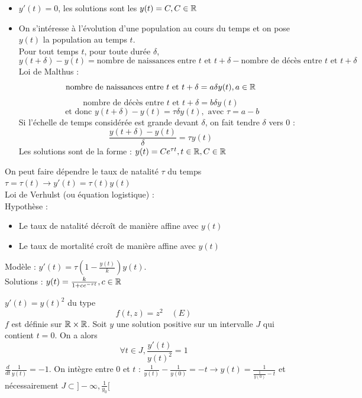 \documentclass[]{report}
\begin{document}
\begin{ex}{}{}
    \begin{itemize}
        \item $y'(t)=0$, les solutions sont les $y(t)=C,C\in\mathbb{R}$
        \item
        On s'intéresse à l'évolution d'une population au cours du temps et on pose $y(t)$ la population au temps $t$.\\
        Pour tout temps $t$, pour toute durée $\delta$, $$y(t+\delta)-y(t)=\text{nombre de naissances entre $t$ et $t+\delta$}-\text{nombre de décès entre $t$ et $t+\delta$}$$
        Loi de Malthus : $$\text{nombre de naissances entre $t$ et $t+\delta$}=a \delta y(t),a\in\mathbb{R}$$
        $$\text{nombre de décès entre $t$ et $t+\delta$}=b\delta y(t)$$
        $$\text{ et donc } y(t+\delta)-y(t)=\tau\delta y(t),\text{ avec }\tau=a-b$$
        Si l'échelle de temps considérée est grande devant $\delta$, on fait tendre $\delta$ vers $0$ :
        $$\frac{y(t+\delta)-y(t)}{\delta}=\tau y(t)$$
        Les solutions sont de la forme : $y(t)=Ce^{\tau t},t\in\mathbb{R},C\in\mathbb{R}$
    \end{itemize}
\end{ex}

\begin{re}{}{}
    On peut faire dépendre le taux de natalité $\tau$ du temps $\tau=\tau(t)\to y'(t)=\tau(t) y(t)$\\
    Loi de Verhulst (ou équation logistique) :\\
    Hypothèse :\begin{itemize}
        \item Le taux de natalité décroît de manière affine avec $y(t)$
        \item Le taux de mortalité croît de manière affine avec $y(t)$
    \end{itemize}
    Modèle : $y'(t)=\tau\left(1-\frac{y(t)}{k}\right)y(t)$.\\
    Solutions : $y(t)=\frac{k}{1+ce^{-\tau t}},c\in\mathbb{R}$
\end{re}

\begin{ex}{}{}
    $y'(t)=y(t)^2$ du type $$f(t,z)=z^2\quad (E)$$
    $f$ est définie sur $\mathbb{R}\times \mathbb{R}$. Soit $y$ une solution positive sur un intervalle $J$ qui contient $t=0$. On a alors $$\forall t\in J,\frac{y'(t)}{y(t)^2}=1$$
    $\frac{d}{dt}\frac{1}{y(t)}=-1$. On intègre entre $0$ et $t$ : $\frac{1}{y(t)}-\frac{1}{y(0)}=-t\longrightarrow y(t)=\frac{1}{\frac{1}{y(0)}-t}$ et nécessairement $J\subset ]-\infty,\frac{1}{y_0}[$
\end{ex}
\end{document}
